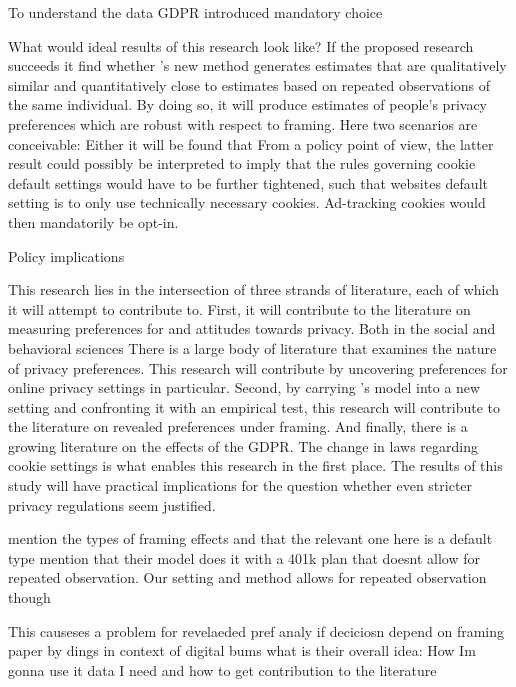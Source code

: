 To understand the 
data
GDPR introduced mandatory choice

What would ideal results of this research look like? If the proposed research succeeds it find whether \textcite{goldin2020}'s new method generates estimates that are 
qualitatively similar and quantitatively close to estimates based on repeated observations of the same individual.
By doing so, it will produce estimates of people's privacy preferences which are robust with respect to framing. Here two scenarios are conceivable: Either it will
be found that   From a policy point of view, the latter result could possibly be interpreted to imply that the rules governing cookie default settings would have to be
further tightened, such that websites default setting is to only use technically necessary cookies. Ad-tracking cookies would then mandatorily be opt-in.



Policy implications

This research lies in the intersection of three strands of literature, each of which it will attempt to contribute to. First, it will contribute to the 
literature on measuring preferences for and attitudes towards privacy. Both in the social and behavioral sciences There is a large body of literature that examines the 
nature of privacy preferences. This research will contribute by uncovering preferences for online privacy settings in particular. Second, by carrying \textcite{goldin2020}'s
model into a new setting and confronting it with an empirical test, this research will contribute to the literature on revealed preferences under framing.
And finally, there is a growing literature on the effects of the GDPR. The change in laws regarding cookie settings is what enables this research in the first place.
The results of this study will have practical implications for the question whether even stricter privacy regulations seem justified.




mention the types of framing effects and that the relevant one here is a default type
mention that their model does it with a 401k plan that doesnt allow for repeated observation. Our setting and method allows for repeated observation though




This causeses a problem for revelaeded pref analy if deciciosn depend on framing  paper by dings  in context of digital bums
what is their overall idea:
How Im gonna use it 
data I need and how to get 
contribution to the literature


